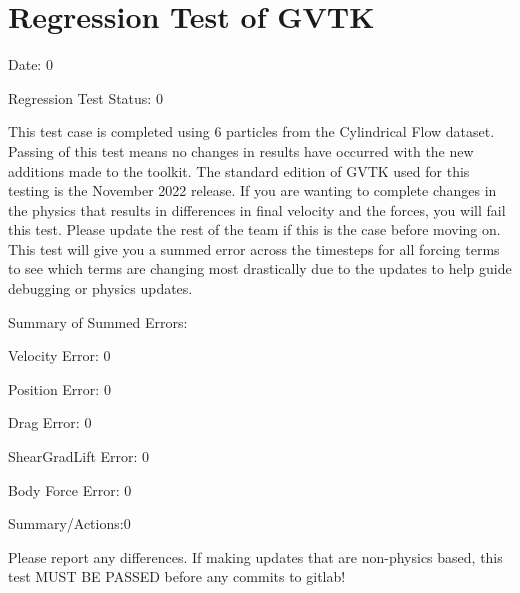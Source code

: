 \documentclass{article}
\begin{document}
\section{Regression Test of GVTK}
Date: 0

\vspace{5pt}

\noindent Regression Test Status: 0

\vspace{5pt}

\noindent This test case is completed using 6 particles from the Cylindrical Flow dataset. Passing of this test means no changes in results have occurred with the new additions made to the toolkit.
The standard edition of GVTK used for this testing is the November 2022 release. If you are wanting to complete changes in the physics that results in differences in final velocity and the forces,
you will fail this test. Please update the rest of the team if this is the case before moving on. This test will give you a summed error across the timesteps for all forcing terms to see which terms
are changing most drastically due to the updates to help guide debugging or physics updates.



\vspace{5pt}

\noindent Summary of Summed Errors:
\vspace{5pt}

Velocity Error: 0

Position Error: 0

Drag Error: 0

ShearGradLift Error: 0

Body Force Error: 0

\vspace{5pt}

\noindent Summary/Actions:0

\vspace{5pt}

\noindent Please report any differences. If making updates that are non-physics based, this test MUST BE PASSED before any commits to gitlab!
\end{document}

